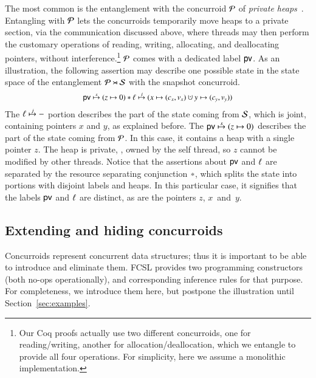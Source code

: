The most common is the entanglement with the concurroid $\mathcal{P}$ of
\emph{private heaps}~\cite[Appendix~B]{Sergey-al:ESOP15ext}. Entangling with
$\mathcal{P}$ lets the concurroids temporarily move heaps to a private
section, via the communication discussed above, where threads may then
perform the customary operations of reading, writing, allocating, and
deallocating pointers, without interference.\footnote{Our Coq proofs
  actually use two different concurroids, one for reading/writing,
  another for allocation/deallocation, which we entangle to provide
  all four operations. For simplicity, here we assume a monolithic
  implementation.}
%
$\mathcal{P}$ comes with a dedicated label $\mathsf{pv}$. As an illustration,
the following assertion may describe one possible state in the state
space of the entanglement $\mathcal{P} \rtimes \mathcal{S}$ with the
snapshot concurroid.
%
%
\[
{\small
\begin{array}{c}
\hpriv \spts (z \hpts 0) \lsep \hps \jpts (x \hpts (c_x, v_x) \hunion
y \hpts (c_y, v_y))
\end{array}
}
\]
%
%
The $\hps \jpts -$ portion describes the part of the state coming from
$\mathcal{S}$, which is joint, containing pointers $x$ and $y$, as
explained before. The $\hpriv \spts (z \hpts 0)$ describes the part of
the state coming from $\mathcal{P}$. In this case, it contains a heap
with a single pointer $z$. The heap is private, \ie, owned by the self
thread, so $z$ cannot be modified by other threads.
%
Notice that the assertions about $\mathsf{pv}$ and $\ell$ are separated by
the resource separating conjunction $\ast$, which splits the state
into portions with disjoint labels and heaps. In this particular case,
it signifies that the labels $\mathsf{pv}$ and $\ell$ are distinct, as are
the pointers $z$, $x$~and~$y$.

%

\newcommand{\inject}[1]{[#1]}

\subsection{Extending and hiding concurroids}
Concurroids represent concurrent data structures; thus it is important
to be able to introduce and eliminate them. FCSL provides two
programming constructors (both no-ops operationally), and
corresponding inference rules for that purpose. For completeness, we
introduce them here, but postpone the illustration until
Section~\ref{sec:examples}.

